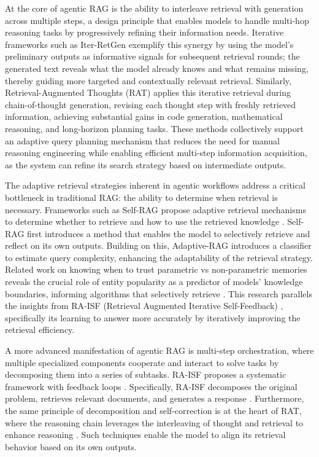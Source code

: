 \documentclass[11pt,a4paper]{article}
\begin{document}
At the core of agentic RAG is the ability to interleave retrieval with generation across multiple steps, a design principle that enables models to handle multi-hop reasoning tasks by progressively refining their information needs. Iterative frameworks such as Iter-RetGen \cite{arxiv:2305.15294v2} exemplify this synergy by using the model's preliminary outputs as informative signals for subsequent retrieval rounds; the generated text reveals what the model already knows and what remains missing, thereby guiding more targeted and contextually relevant retrieval. Similarly, Retrieval-Augmented Thoughts (RAT) \cite{arxiv:2403.05313v1} applies this iterative retrieval during chain-of-thought generation, revising each thought step with freshly retrieved information, achieving substantial gains in code generation, mathematical reasoning, and long-horizon planning tasks. These methods collectively support an adaptive query planning mechanism that reduces the need for manual reasoning engineering while enabling efficient multi-step information acquisition, as the system can refine its search strategy based on intermediate outputs.

The adaptive retrieval strategies inherent in agentic workflows address a critical bottleneck in traditional RAG: the ability to determine when retrieval is necessary. Frameworks such as Self-RAG \cite{arxiv:2310.11511v1} propose adaptive retrieval mechanisms to determine whether to retrieve and how to use the retrieved knowledge \cite{arxiv:2310.11511v1}. Self-RAG \cite{arxiv:2310.11511v1} first introduces a method that enables the model to selectively retrieve and reflect on its own outputs. Building on this, Adaptive-RAG \cite{arxiv:2403.14403v2} introduces a classifier to estimate query complexity, enhancing the adaptability of the retrieval strategy. Related work on knowing when to trust parametric vs non-parametric memories reveals the crucial role of entity popularity as a predictor of models' knowledge boundaries, informing algorithms that selectively retrieve \cite{arxiv:2212.10511v4}. This research parallels the insights from RA-ISF (Retrieval Augmented Iterative Self-Feedback) \cite{arxiv:2403.06840v1}, specifically its learning to answer more accurately by iteratively improving the retrieval efficiency.

A more advanced manifestation of agentic RAG is multi-step orchestration, where multiple specialized components cooperate and interact to solve tasks by decomposing them into a series of subtasks. RA-ISF \cite{arxiv:2403.06840v1} proposes a systematic framework with feedback loops \cite{arxiv:2403.06840v1}. Specifically, RA-ISF decomposes the original problem, retrieves relevant documents, and generates a response \cite{arxiv:2403.06840v1}. Furthermore, the same principle of decomposition and self-correction is at the heart of RAT, where the reasoning chain leverages the interleaving of thought and retrieval to enhance reasoning \cite{arxiv:2403.05313v1}. Such techniques enable the model to align its retrieval behavior based on its own outputs.
\end{document}

